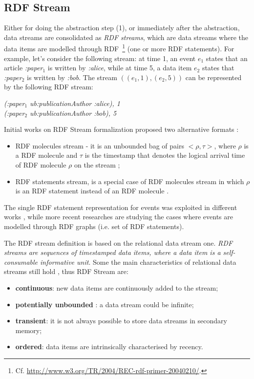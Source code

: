 \subsection{RDF Stream}\label{sec:rdfstream}

Either for doing the abstraction step (1), or immediately after the abstraction, data streams are consolidated as \textit{RDF streams}, which are data streams where the data items are modelled through RDF~\footnote{Cf. \url{http://www.w3.org/TR/2004/REC-rdf-primer-20040210/}.} (one or more RDF statements). For example, let's consider the following stream: at time 1, an event $e_1$ states that an article \textit{:paper$_1$} is written by \textit{:alice}, while at time 5, a data item $e_2$ states that \textit{:paper$_2$} is written by \textit{:bob}. The stream $((e_1,1),(e_2,5))$ can be represented by the following RDF stream:

\vspace{5pt}
\noindent\textit{(:paper$_1$ ub:publicationAuthor :alice), 1}\\
\textit{(:paper$_2$ ub:publicationAuthor :bob), 5}
\vspace{5pt}

Initial works on RDF Stream formalization proposed two alternative formats \cite{DBLP:conf/fis/ValleCBBC08}:
\begin{itemize}
\item RDF molecules stream - it is an unbounded bag of pairs $< \rho, \tau >$, where $\rho$ is a RDF molecule \cite{TrackingMolecules} and $\tau$ is the timestamp that denotes the logical arrival time of RDF molecule $\rho$ on the stream \cite{DBLP:conf/fis/ValleCBBC08};
\item RDF statements stream, is a special case of RDF molecules stream in which $\rho$ is an RDF statement instead of an RDF molecule  .
\end{itemize} 

The single RDF statement representation for events was exploited in different works  \cite{Barbieri2010,Lephuoc2011}, while more recent researches \cite{DBLP:conf/semweb/BalduiniVDTPC13} are studying the cases where events are modelled through RDF graphs (i.e. set of RDF statements). 

The  RDF stream  definition is based on the relational data stream one. \textit{RDF streams are sequences of timestamped data items, where a data item is a self- consumable informative unit}. Some the main characteristics of relational data streams still hold \cite{DBLP:conf/pods/BabcockBDMW02}, thus RDF Stream are:
\begin{itemize}
\item \textbf{continuous}: new data items are continuously added to the stream;
\item \textbf{potentially unbounded} : a data stream could be infinite;
\item \textbf{transient}: it is not always possible to store data streams in secondary memory;
\item \textbf{ordered}: data items are intrinsically characterised by recency.
\end{itemize}

